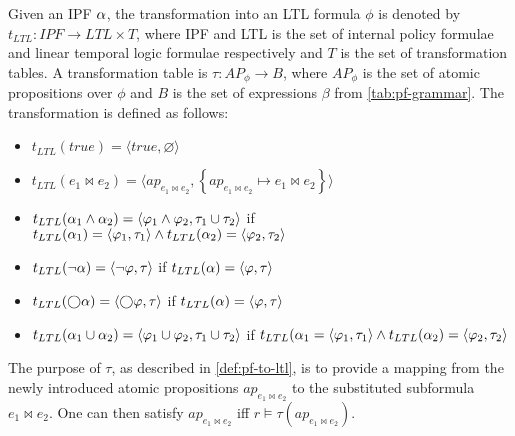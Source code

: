 \begin{definition}\label{def:pf-to-ltl}
Given an IPF $\alpha$, the transformation into an LTL formula $\phi$ is denoted by $t_{LTL} : IPF \rightarrow LTL \times T$, where IPF and LTL is the set of internal policy formulae and linear temporal logic formulae respectively and $T$ is the set of transformation tables. A transformation table is $\tau : AP_\phi \rightarrow B$, where $AP_\phi$ is the set of atomic propositions over $\phi$ and $B$ is the set of expressions $\beta$ from \autoref{tab:pf-grammar}. The transformation is defined as follows:
\begin{itemize}
    \item $t_{LTL}(true) = \langle true, \varnothing \rangle$
    \item $t_{LTL}(e_1 \bowtie e_2) = \langle ap_{e_1 \bowtie e_2}, \left\{ ap_{e_1 \bowtie e_2} \mapsto e_1 \bowtie e_2 \right\} \rangle$
    \item $t_{LTL}(\alpha_1 \land \alpha_2) = \langle \varphi_1 \land \varphi_2, \tau_1 \cup \tau_2 \rangle$ if $t_{LTL}(\alpha_1) = \langle \varphi_1, \tau_1 \rangle \land t_{LTL}(\alpha_2) = \langle \varphi_2, \tau_2 \rangle$
    \item $t_{LTL}(\lnot \alpha) = \langle \lnot \varphi, \tau \rangle$ if $t_{LTL}(\alpha) = \langle \varphi, \tau \rangle$
    \item $t_{LTL}(\bigcirc \alpha) = \langle \bigcirc \varphi, \tau \rangle$ if $t_{LTL}(\alpha) = \langle \varphi, \tau \rangle$
    \item $t_{LTL}(\alpha_1 \cup \alpha_2) = \langle \varphi_1 \cup \varphi_2, \tau_1 \cup \tau_2 \rangle$ if $t_{LTL}(\alpha_1 = \langle \varphi_1, \tau_1 \rangle \land t_{LTL}(\alpha_2) = \langle \varphi_2, \tau_2 \rangle$
\end{itemize}
\end{definition}
The purpose of $\tau$, as described in \autoref{def:pf-to-ltl}, is to provide a mapping from the newly introduced atomic propositions $ap_{e_1 \bowtie e_2}$ to the substituted subformula $e_1 \bowtie e_2$. One can then satisfy $ap_{e_1 \bowtie e_2}$ iff $r \models \tau(ap_{e_1 \bowtie e_2})$.

